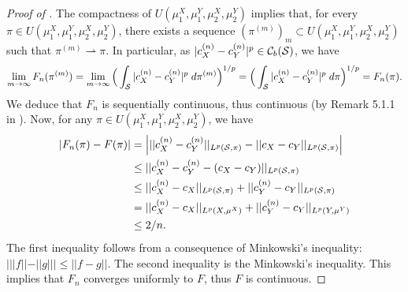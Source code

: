 \begin{proof}[Proof of ]
  The compactness of $U(\mu_1^X, \mu_1^Y, \mu_2^X, \mu_2^Y)$ implies that, for every
  $\pi \in U(\mu_1^X, \mu_1^Y, \mu_2^X, \mu_2^Y)$,
  there exists a sequence $(\pi^{(m)})_m \subset U(\mu_1^X, \mu_1^Y, \mu_2^X, \mu_2^Y)$ such that
  $\pi^{(m)} \rightharpoonup \pi$. In particular, as
  $\vert c_X^{(n)} - c_Y^{(n)} \vert^p \in \mathcal C_b(\mathcal S)$, we have
  \begin{equation}
    \begin{split}
      \lim_{m \to \infty} F_n(\pi^{(m)}) =
      \lim_{m \to \infty} \Big( \int_{\mathcal S} \vert c_X^{(n)} - c_Y^{(n)} \vert^p \;
      d\pi^{(m)} \Big)^{1/p}
      = \Big( \int_{\mathcal S} \vert c_X^{(n)} - c_Y^{(n)} \vert^p \; d\pi \Big)^{1/p} = F_n(\pi).
    \end{split}
  \end{equation}
  We deduce that $F_n$ is sequentially continuous, thus continuous
  (by Remark 5.1.1 in \citep{Ambrosio05}).
  Now, for any $\pi \in U(\mu_1^X, \mu_1^Y, \mu_2^X, \mu_2^Y)$, we have
  \begin{equation}
    \begin{split}
      \vert F_n(\pi) - F(\pi) \vert &=
      \Big\vert \vert\vert c_X^{(n)} - c_Y^{(n)} \vert\vert_{L^p(\mathcal S, \pi)}
      - \vert\vert c_X - c_Y \vert\vert_{L^p(\mathcal S, \pi)} \Big\vert \\
      &\leq \vert\vert c_X^{(n)} - c_Y^{(n)} - (c_X - c_Y) \vert\vert_{L^p(\mathcal S, \pi)} \\
      &\leq \vert\vert c_X^{(n)} - c_X \vert\vert_{L^p(\mathcal S, \pi)} +
      \vert\vert c_Y^{(n)} - c_Y \vert\vert_{L^p(\mathcal S, \pi)} \\
      &= \vert\vert c_X^{(n)} - c_X \vert\vert_{L^p(X, \mu^X)} +
      \vert\vert c_Y^{(n)} - c_Y \vert\vert_{L^p(Y, \mu^Y)} \\
      &\leq 2/n.
    \end{split}
  \end{equation}
  The first inequality follows from a consequence of Minkowski's inequality:
  $ \Big\vert \vert\vert f \vert\vert - \vert\vert g \vert\vert \Big\vert
  \leq \vert\vert f-g \vert\vert$. The second inequality is the Minkowski's inequality.
  This implies that $F_n$ converges uniformly to $F$, thus $F$ is continuous.
\end{proof}


